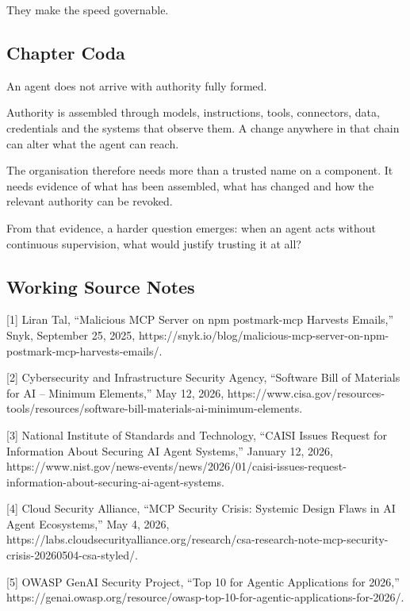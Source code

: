 They make the speed governable.

\subsection{Chapter Coda}\label{chapter-coda}

An agent does not arrive with authority fully formed.

Authority is assembled through models, instructions, tools, connectors,
data, credentials and the systems that observe them. A change anywhere
in that chain can alter what the agent can reach.

The organisation therefore needs more than a trusted name on a
component. It needs evidence of what has been assembled, what has
changed and how the relevant authority can be revoked.

From that evidence, a harder question emerges: when an agent acts
without continuous supervision, what would justify trusting it at all?

\subsection{Working Source Notes}\label{working-source-notes}

{[}1{]} Liran Tal, ``Malicious MCP Server on npm postmark-mcp Harvests
Emails,'' Snyk, September 25, 2025,
https://snyk.io/blog/malicious-mcp-server-on-npm-postmark-mcp-harvests-emails/.

{[}2{]} Cybersecurity and Infrastructure Security Agency, ``Software
Bill of Materials for AI -- Minimum Elements,'' May 12, 2026,
https://www.cisa.gov/resources-tools/resources/software-bill-materials-ai-minimum-elements.

{[}3{]} National Institute of Standards and Technology, ``CAISI Issues
Request for Information About Securing AI Agent Systems,'' January 12,
2026,
https://www.nist.gov/news-events/news/2026/01/caisi-issues-request-information-about-securing-ai-agent-systems.

{[}4{]} Cloud Security Alliance, ``MCP Security Crisis: Systemic Design
Flaws in AI Agent Ecosystems,'' May 4, 2026,
https://labs.cloudsecurityalliance.org/research/csa-research-note-mcp-security-crisis-20260504-csa-styled/.

{[}5{]} OWASP GenAI Security Project, ``Top 10 for Agentic Applications
for 2026,''
https://genai.owasp.org/resource/owasp-top-10-for-agentic-applications-for-2026/.
